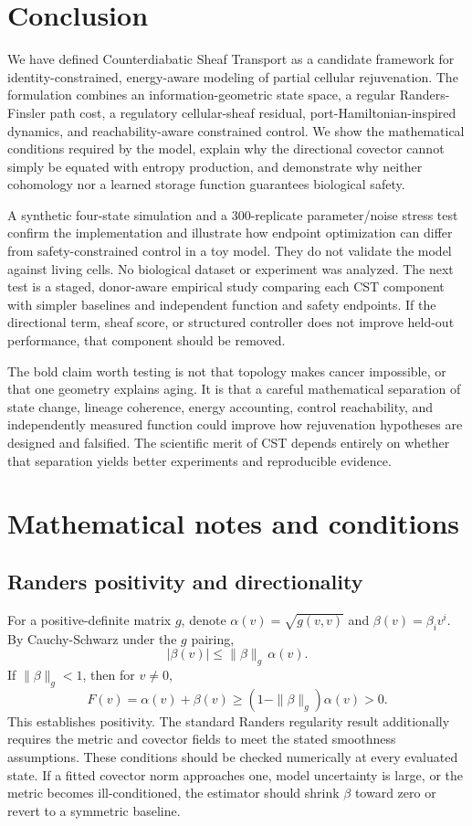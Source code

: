 \documentclass[11pt,a4paper]{article}
\theoremstyle{definition}
\theoremstyle{remark}
\begin{document}
\section{Conclusion}
We have defined Counterdiabatic Sheaf Transport as a candidate framework for identity-constrained, energy-aware modeling of partial cellular rejuvenation. The formulation combines an information-geometric state space, a regular Randers-Finsler path cost, a regulatory cellular-sheaf residual, port-Hamiltonian-inspired dynamics, and reachability-aware constrained control. We show the mathematical conditions required by the model, explain why the directional covector cannot simply be equated with entropy production, and demonstrate why neither cohomology nor a learned storage function guarantees biological safety.

A synthetic four-state simulation and a 300-replicate parameter/noise stress test confirm the implementation and illustrate how endpoint optimization can differ from safety-constrained control in a toy model. They do not validate the model against living cells. No biological dataset or experiment was analyzed. The next test is a staged, donor-aware empirical study comparing each CST component with simpler baselines and independent function and safety endpoints. If the directional term, sheaf score, or structured controller does not improve held-out performance, that component should be removed.

The bold claim worth testing is not that topology makes cancer impossible, or that one geometry explains aging. It is that a careful mathematical separation of state change, lineage coherence, energy accounting, control reachability, and independently measured function could improve how rejuvenation hypotheses are designed and falsified. The scientific merit of CST depends entirely on whether that separation yields better experiments and reproducible evidence.

\clearpage
\appendix
\section{Mathematical notes and conditions}
\subsection{Randers positivity and directionality}
For a positive-definite matrix $g$, denote $\alpha(v)=\sqrt{g(v,v)}$ and $\beta(v)=\beta_i v^i$. By Cauchy-Schwarz under the $g$ pairing,
\begin{equation}
|\beta(v)|\leq \|\beta\|_g\,\alpha(v).
\end{equation}
If $\|\beta\|_g<1$, then for $v\neq0$,
\begin{equation}
F(v)=\alpha(v)+\beta(v)\geq (1-\|\beta\|_g)\alpha(v)>0.
\end{equation}
This establishes positivity. The standard Randers regularity result additionally requires the metric and covector fields to meet the stated smoothness assumptions. These conditions should be checked numerically at every evaluated state. If a fitted covector norm approaches one, model uncertainty is large, or the metric becomes ill-conditioned, the estimator should shrink $\beta$ toward zero or revert to a symmetric baseline.
\end{document}
